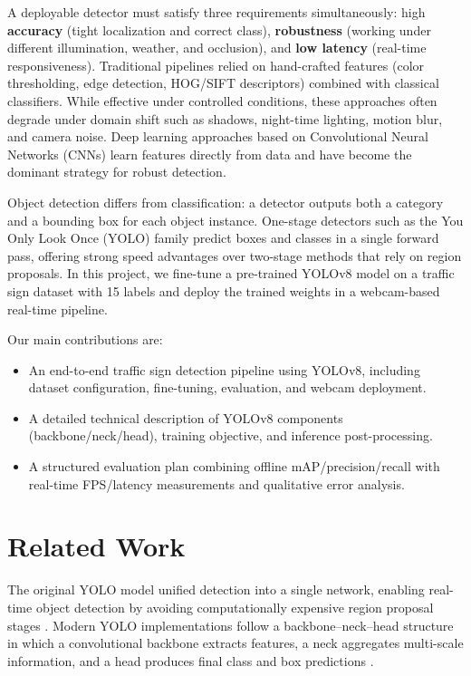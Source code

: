 \documentclass[conference]{IEEEtran}
\begin{document}
A deployable detector must satisfy three requirements simultaneously: high \textbf{accuracy} (tight localization and correct class), \textbf{robustness} (working under different illumination, weather, and occlusion), and \textbf{low latency} (real-time responsiveness). Traditional pipelines relied on hand-crafted features (color thresholding, edge detection, HOG/SIFT descriptors) combined with classical classifiers. While effective under controlled conditions, these approaches often degrade under domain shift such as shadows, night-time lighting, motion blur, and camera noise. Deep learning approaches based on Convolutional Neural Networks (CNNs) learn features directly from data and have become the dominant strategy for robust detection.

Object detection differs from classification: a detector outputs both a category and a bounding box for each object instance. One-stage detectors such as the You Only Look Once (YOLO) family predict boxes and classes in a single forward pass, offering strong speed advantages over two-stage methods that rely on region proposals. In this project, we fine-tune a pre-trained YOLOv8 model on a traffic sign dataset with 15 labels and deploy the trained weights in a webcam-based real-time pipeline.

Our main contributions are:
\begin{itemize}
    \item An end-to-end traffic sign detection pipeline using YOLOv8, including dataset configuration, fine-tuning, evaluation, and webcam deployment.
    \item A detailed technical description of YOLOv8 components (backbone/neck/head), training objective, and inference post-processing.
    \item A structured evaluation plan combining offline mAP/precision/recall with real-time FPS/latency measurements and qualitative error analysis.
\end{itemize}

\section{Related Work}
The original YOLO model unified detection into a single network, enabling real-time object detection by avoiding computationally expensive region proposal stages \cite{YOLO_original}. Modern YOLO implementations follow a backbone--neck--head structure in which a convolutional backbone extracts features, a neck aggregates multi-scale information, and a head produces final class and box predictions \cite{viso_yolov8}.
\end{document}
